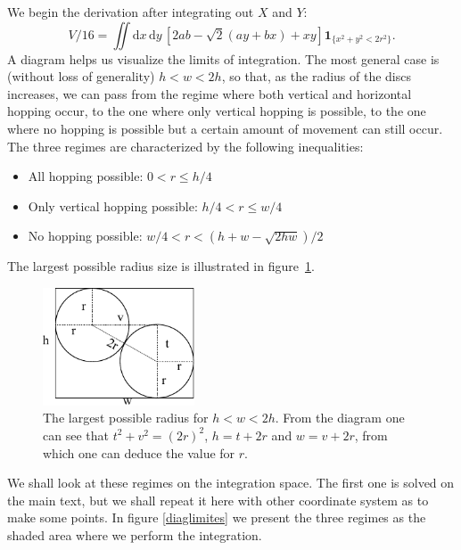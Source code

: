 \documentclass[superscriptaddress,pre,reprint,showpacs,onecolumn]{revtex4-1}
\newcommand{\rd}[1]{\mathrm{d}{#1} \,}
\newcommand{\indicator}[1]{\mathbf{1}_{ \{   #1 \} } }
\begin{document}
We begin the derivation after integrating out $X$ and $Y$:
\begin{equation}\label{VolumenGeneral}
V/16 =\iint \rd x \rd y \left[ 2ab-\sqrt{2}(ay+bx)+x y \right]
\indicator{x^2+y^2 < 2r^2 }.
\end{equation}
A diagram helps us visualize the limits of integration. The most general
case is (without loss of generality) $h < w < 2h$, so that, as the radius of the
discs increases, we can pass from the regime where both vertical and horizontal
hopping occur, to the one where only vertical hopping
is possible, to the one where no hopping is possible but a certain amount of movement
can still occur. The three regimes are characterized by the following inequalities:
\begin{itemize}
\item All hopping possible: $0<r \leq h/4$
\item Only vertical hopping possible: $h/4 < r \leq w/4$
\item No hopping possible: $w/4 < r < (h+w-\sqrt{2hw})/2$
\end{itemize}
The largest possible radius size is illustrated in figure~\ref{radiomaximo}.
\begin{figure}[h]
  \centering
  \includegraphics[width=0.4\textwidth]{FigurasPerfectas/DiagramaRadioMaximo.pdf}
  \caption{The largest possible radius for $h<w<2h$. From the diagram
    one can see that $t^2+v^2=(2r)^2$, $h=t+2r$ and $w=v+2r$, from which
    one can deduce the value for $r$.}
  \label{radiomaximo}
\end{figure}
We shall look at these regimes on the integration space. The first one is solved
on the main text, but we shall repeat it here with other coordinate system as to
make some points. In figure \ref{diaglimites} we present the three regimes as
the shaded area where we perform the integration. 
  
\end{document}
